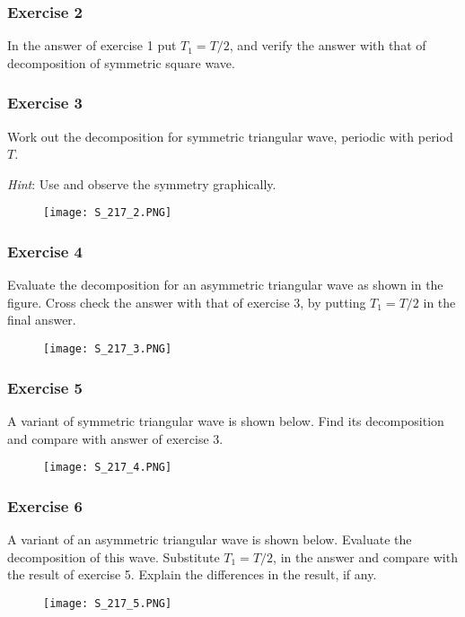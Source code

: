                 
\subsubsection{Exercise 2}
\noindent
In the answer of exercise 1 put $T_1 =T/2$, and verify the answer with that of decomposition of symmetric square wave.

\subsubsection{Exercise 3}
\noindent
Work out the decomposition for symmetric triangular wave, periodic with period $T$.

\noindent
\textit{Hint}: Use and observe the symmetry graphically.
\begin{figure}[ht]
\centering
\texttt{[image: S\_217\_2.PNG]}
\end{figure}


\subsubsection{Exercise 4}
\noindent
Evaluate the decomposition for an asymmetric triangular wave as shown in the figure. Cross check the answer with that of exercise 3, by putting  $T_1 = T/2$ in the final answer.
\begin{figure}[ht]
\centering
\texttt{[image: S\_217\_3.PNG]}
\end{figure}


\subsubsection{Exercise 5}
\noindent
A variant of symmetric triangular wave is shown below. Find its decomposition and compare with answer of exercise 3.
\begin{figure}[ht]
\centering
\texttt{[image: S\_217\_4.PNG]}
\end{figure}

\pagebreak

\subsubsection{Exercise 6}
\noindent
A variant of an asymmetric triangular wave is shown below. Evaluate the decomposition of  this wave. Substitute $T_1 = T/2$, in the answer and compare with the result of exercise 5. Explain the differences in the result, if any.
\begin{figure}[ht]
\centering
\texttt{[image: S\_217\_5.PNG]}
\end{figure}








                



                     
